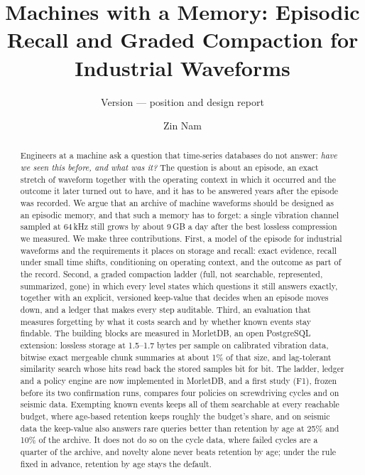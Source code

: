 \documentclass[sigconf,nonacm]{acmart}
\newcommand{\M}{MorletDB}
\newcommand{\ReportVersion}{\unskip}
\begin{document}
\title{Machines with a Memory: Episodic Recall and Graded Compaction for Industrial Waveforms}
\subtitle{Version \ReportVersion{} --- position and design report}
\author{Zin Nam}

\begin{abstract}
Engineers at a machine ask a question that time-series databases do not answer: \emph{have we seen this before, and what was it?} The question is about an episode, an exact stretch of waveform together with the operating context in which it occurred and the outcome it later turned out to have, and it has to be answered years after the episode was recorded. We argue that an archive of machine waveforms should be designed as an episodic memory, and that such a memory has to forget: a single vibration channel sampled at 64\,kHz still grows by about 9\,GB a day after the best lossless compression we measured. We make three contributions. First, a model of the episode for industrial waveforms and the requirements it places on storage and recall: exact evidence, recall under small time shifts, conditioning on operating context, and the outcome as part of the record. Second, a graded compaction ladder (full, not searchable, represented, summarized, gone) in which every level states which questions it still answers exactly, together with an explicit, versioned keep-value that decides when an episode moves down, and a ledger that makes every step auditable. Third, an evaluation that measures forgetting by what it costs search and by whether known events stay findable. The building blocks are measured in \M{}, an open PostgreSQL extension: lossless storage at 1.5--1.7 bytes per sample on calibrated vibration data, bitwise exact mergeable chunk summaries at about 1\% of that size, and lag-tolerant similarity search whose hits read back the stored samples bit for bit. The ladder, ledger and a policy engine are now implemented in \M{}, and a first study (F1), frozen before its two confirmation runs, compares four policies on screwdriving cycles and on seismic data. Exempting known events keeps all of them searchable at every reachable budget, where age-based retention keeps roughly the budget's share, and on seismic data the keep-value also answers rare queries better than retention by age at 25\% and 10\% of the archive. It does not do so on the cycle data, where failed cycles are a quarter of the archive, and novelty alone never beats retention by age; under the rule fixed in advance, retention by age stays the default.
\end{abstract}
\end{document}
